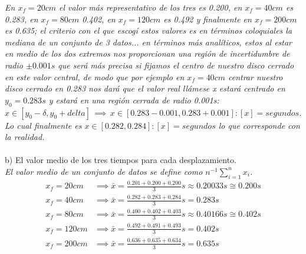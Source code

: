 \documentclass{article}
\begin{document}
\textit{En $x_f=20cm$ el valor más representativo de los tres es 0.200, en $x_f=40cm$ es 0.283, en $x_f=80cm$ 0.402, en $x_f=120cm$ es 0.492 y finalmente en $x_f=200cm$ es 0.635; el criterio con el que escogí estos valores es en términos coloquiales la mediana de un conjunto de 3 datos... en términos más analíticos, estos al estar en medio de los dos extremos nos proporcionan una región de incertidumbre de radio $\pm 0.001s$ que será más precisa si fijamos el centro de nuestro disco cerrado en este valor central, de modo que por ejemplo en $x_f=40cm$ centrar nuestro disco cerrado en 0.283 nos dará que el valor real llámese x estará centrado en $y_0=0.283s$ y estará en una región cerrada de radio 0.001s: $x \in [y_0-\delta, y_0+delta] \, \implies \, x \in [0.283-0.001, 0.283+0.001] : [x] = segundos$. Lo cual finalmente es $x \in [0.282, 0.284] : [x] = segundos$ lo que corresponde con la realidad.}\\\\
b) El valor medio de los tres tiempos para cada desplazamiento. \\
\textit{El valor medio de un conjunto de datos se define como $n^{-1}\sum_{i=1}^n x_i$.}
\begin{align*}
    x_f = 20cm &\implies \bar{x} = \frac{0.201+0.200+0.200}{3}s \approx 0.20033s \cong 0.200s \\
    x_f = 40cm &\implies \bar{x} = \frac{0.282+0.283+0.284}{3}s = 0.283s \\
    x_f = 80cm &\implies \bar{x} = \frac{0.400+0.402+0.403}{3}s \approx 0.40166s \cong 0.402s \\
    x_f = 120cm &\implies \bar{x} = \frac{0.492+0.491+0.493}{3}s = 0.402s \\
    x_f = 200cm &\implies \bar{x} = \frac{0.636+0.635+0.634}{3}s = 0.635s \\
\end{align*}
\end{document}

